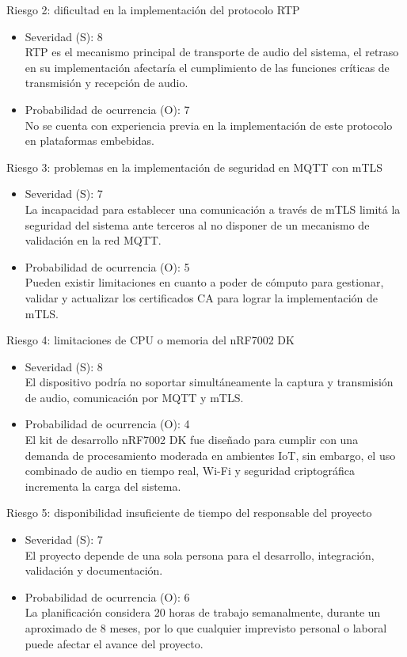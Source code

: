 \documentclass[
11pt, %
]{charter}
\begin{document}
Riesgo 2: dificultad en la implementación del protocolo RTP
\begin{itemize}
	\item Severidad (S): 8 \\
	RTP es el mecanismo principal de transporte de audio del sistema, el retraso en su implementación afectaría el cumplimiento de las funciones críticas de transmisión y recepción de audio.
	\item Probabilidad de ocurrencia (O):  7 \\
	No se cuenta con experiencia previa en la implementación de este protocolo en plataformas embebidas.
\end{itemize}


Riesgo 3: problemas en la implementación de seguridad en MQTT con mTLS
\begin{itemize}
	\item Severidad (S): 7 \\
	La incapacidad para establecer una comunicación a través de mTLS limitá la seguridad del sistema ante terceros al no disponer de un mecanismo de validación en la red MQTT.
	\item Probabilidad de ocurrencia (O): 5 \\
	Pueden existir limitaciones en cuanto a poder de cómputo para gestionar, validar y actualizar los certificados CA para lograr la implementación de mTLS.
\end{itemize}

Riesgo 4: limitaciones de CPU o memoria del nRF7002 DK

\begin{itemize}
	\item Severidad (S): 8 \\
	El dispositivo podría no soportar simultáneamente la captura y transmisión de audio, comunicación por MQTT y mTLS.
	\item Probabilidad de ocurrencia (O): 4 \\
	El kit de desarrollo nRF7002 DK fue diseñado para cumplir con una demanda de procesamiento moderada en ambientes IoT, sin embargo, el uso combinado de audio en tiempo real, Wi-Fi y seguridad criptográfica incrementa la carga del sistema.
\end{itemize}

Riesgo 5: disponibilidad insuficiente de tiempo del responsable del proyecto

\begin{itemize}
	\item Severidad (S): 7 \\
	El proyecto depende de una sola persona para el desarrollo, integración, validación y documentación. 
	
	\item Probabilidad de ocurrencia (O): 6 \\
	La planificación considera 20 horas de trabajo semanalmente, durante un aproximado de 8 meses, por lo que cualquier imprevisto personal o laboral puede afectar el avance del proyecto. 
\end{itemize}
\end{document}
